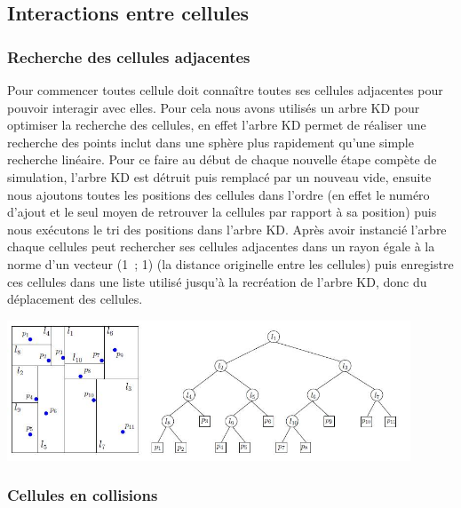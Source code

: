 \documentclass[a4paper,11pt]{article}
\begin{document}
\subsection{Interactions entre cellules}

\subsubsection{Recherche des cellules adjacentes}

Pour commencer toutes cellule doit connaître toutes ses cellules adjacentes pour pouvoir interagir avec elles.
Pour cela nous avons utilisés un arbre KD pour optimiser la recherche des cellules, en effet l'arbre KD permet de réaliser une recherche des points inclut dans une sphère plus rapidement qu'une simple recherche linéaire.
Pour ce faire au début de chaque nouvelle étape compète de simulation, l'arbre KD est détruit puis remplacé par un nouveau vide, ensuite nous ajoutons toutes les positions des cellules dans l'ordre (en effet le numéro d'ajout et le seul moyen de retrouver la cellules par rapport à sa position) puis nous exécutons le tri des positions dans l'arbre KD.
Après avoir instancié l'arbre chaque cellules peut rechercher ses cellules adjacentes dans un rayon égale à la norme d'un vecteur (1~; 1) (la distance originelle entre les cellules) puis enregistre ces cellules dans une liste utilisé jusqu'à la recréation de l'arbre KD, donc du déplacement des cellules.

\begin{center}
  \includegraphics[width=12cm]{Images/kd_tree.jpg}
\end{center}


\subsubsection{Cellules en collisions}
\end{document}
